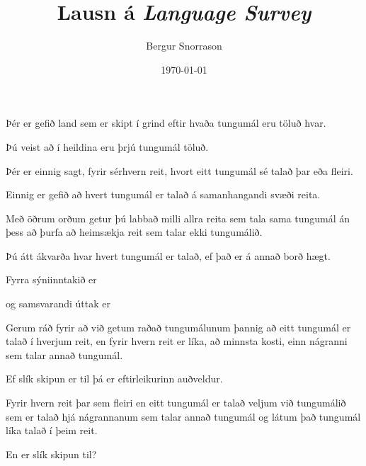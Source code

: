 \title{Lausn á \emph{Language Survey}}
\author{Bergur Snorrason}
\date{\today}



\frame{\titlepage}

{
	{
		\item<1-> Þér er gefið land sem er skipt í grind eftir hvaða tungumál eru töluð hvar.
		\item<2-> Þú veist að í heildina eru þrjú tungumál töluð.
		\item<3-> Þér er einnig sagt, fyrir sérhvern reit, hvort eitt tungumál sé talað þar eða fleiri.
		\item<4-> Einnig er gefið að hvert tungumál er talað á samanhangandi svæði reita.
		\item<5-> Með öðrum orðum getur þú labbað milli allra reita sem tala sama tungumál án þess að þurfa að heimsækja reit sem talar ekki tungumálið.
		\item<6-> Þú átt ákvarða hvar hvert tungumál er talað, ef það er á annað borð hægt.
	}
}

{
	{
		\item<1-> Fyrra sýniinntakið er
		\item<2->[] 
		\item<3-> og samsvarandi úttak er
		\item<4->[]
	}
}

{
	{
		\item<1-> Gerum ráð fyrir að við getum raðað tungumálunum þannig að eitt tungumál er talað í hverjum reit,
					en fyrir hvern reit er líka, að minnsta kosti, einn nágranni sem talar annað tungumál.
		\item<2-> Ef slík skipun er til þá er eftirleikurinn auðveldur.
		\item<3-> Fyrir hvern reit þar sem fleiri en eitt tungumál er talað veljum við tungumálið sem er talað hjá nágrannanum sem talar annað tungumál
					og látum það tungumál líka talað í þeim reit.
		\item<4-> En er slík skipun til?
	}
}

